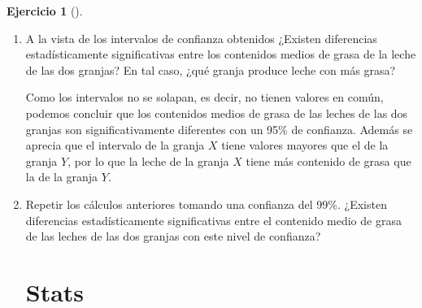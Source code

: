 \documentclass[
  a4paper,
]{scrreport}
\newenvironment{Shaded}{\begin{snugshade}}{\end{snugshade}}
\newcommand{\ExtensionTok}[1]{\textcolor[rgb]{0.00,0.23,0.31}{#1}}
\newcommand{\NormalTok}[1]{\textcolor[rgb]{0.00,0.23,0.31}{#1}}
\theoremstyle{definition}
\newtheorem{exercise}{Ejercicio}[chapter]
\theoremstyle{remark}
\begin{document}
\begin{exercise}[]
\begin{enumerate}
\begin{tcolorbox}
\begin{Shaded}
\begin{Highlighting}[]
\ExtensionTok{Dibujar}\NormalTok{ los intervalos de confianza obtenidos para cada granja.}
\end{Highlighting}
\end{Shaded}

  \end{tcolorbox}
\item
  A la vista de los intervalos de confianza obtenidos ¿Existen
  diferencias estadísticamente significativas entre los contenidos
  medios de grasa de la leche de las dos granjas? En tal caso, ¿qué
  granja produce leche con más grasa?

  \begin{tcolorbox}[enhanced jigsaw, colframe=quarto-callout-tip-color-frame, toprule=.15mm, bottomtitle=1mm, breakable, opacitybacktitle=0.6, toptitle=1mm, colback=white, bottomrule=.15mm, title=\textcolor{quarto-callout-tip-color}{\faLightbulb}\hspace{0.5em}{Solución}, arc=.35mm, left=2mm, titlerule=0mm, rightrule=.15mm, coltitle=black, leftrule=.75mm, opacityback=0, colbacktitle=quarto-callout-tip-color!10!white]

  Como los intervalos no se solapan, es decir, no tienen valores en
  común, podemos concluir que los contenidos medios de grasa de las
  leches de las dos granjas son significativamente diferentes con un
  95\% de confianza. Además se aprecia que el intervalo de la granja
  \(X\) tiene valores mayores que el de la granja \(Y\), por lo que la
  leche de la granja \(X\) tiene más contenido de grasa que la de la
  granja \(Y\).

  \end{tcolorbox}
\item
  Repetir los cálculos anteriores tomando una confianza del 99\%.
  ¿Existen diferencias estadísticamente significativas entre el
  contenido medio de grasa de las leches de las dos granjas con este
  nivel de confianza?

  \begin{tcolorbox}[enhanced jigsaw, colframe=quarto-callout-tip-color-frame, toprule=.15mm, bottomtitle=1mm, breakable, opacitybacktitle=0.6, toptitle=1mm, colback=white, bottomrule=.15mm, title=\textcolor{quarto-callout-tip-color}{\faLightbulb}\hspace{0.5em}{Solución}, arc=.35mm, left=2mm, titlerule=0mm, rightrule=.15mm, coltitle=black, leftrule=.75mm, opacityback=0, colbacktitle=quarto-callout-tip-color!10!white]

  \section{Stats}


\end{tcolorbox}
\end{enumerate}
\end{exercise}
\end{document}

